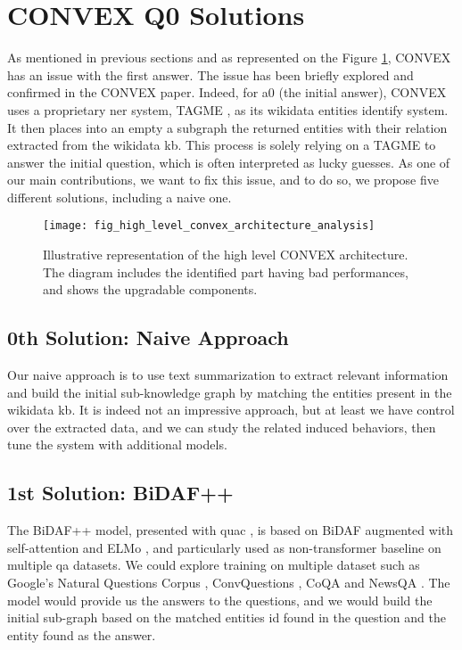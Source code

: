 \section{CONVEX Q0 Solutions}
\label{analysis:convexq0}
As mentioned in previous sections and as represented on the Figure \ref{fig:fig_high_level_convex_architecture_analysis}, CONVEX \autocite{paper:convex} has an issue with the first answer. The issue has been briefly explored and confirmed in the CONVEX paper. Indeed, for a0 (the initial answer), CONVEX uses a proprietary \gls{ner} system, TAGME \autocite{paper:CIKM-2010-FerraginaS}, as its \gls{wikidata} entities identify system. It then places into an empty a subgraph the returned entities with their relation extracted from the \gls{wikidata} \gls{kb}. This process is solely relying on a TAGME to answer the initial question, which is often interpreted as lucky guesses. As one of our main contributions, we want to fix this issue, and to do so, we propose five different solutions, including a naive one. 

\begin{figure}
    \centering
    \texttt{[image: fig\_high\_level\_convex\_architecture\_analysis]}
    \caption{Illustrative representation of the high level CONVEX architecture. The diagram includes the identified part having bad performances, and shows the upgradable components.}
    \label{fig:fig_high_level_convex_architecture_analysis}
\end{figure}

\subsection{0th Solution: Naive Approach}
\label{analysis:naive}
Our naive approach is to use text summarization to extract relevant information and build the initial sub-knowledge graph by matching the entities present in the \gls{wikidata} \gls{kb}. It is indeed not an impressive approach, but at least we have control over the extracted data, and we can study the related induced behaviors, then tune the system with additional models.

\subsection{1st Solution: BiDAF++}
\label{analysis:bidaf}
The BiDAF++ model, presented with \gls{quac} \autocite{paper:journals/corr/abs-1808-07036}, is based on BiDAF \autocite{paper:journals/corr/SeoKFH16} augmented with self-attention \autocite{paper:journals/corr/abs-1710-10723} and ELMo \autocite{paper:journals/corr/abs-1802-05365}, and particularly used as non-\gls{transformer} baseline on multiple \gls{qa} datasets. We could explore training on multiple dataset such as Google's Natural Questions Corpus \autocite{paper:google-natural-questions}, ConvQuestions \autocite{paper:convex}, CoQA \autocite{paper:journals/corr/abs-1808-07042} and NewsQA \autocite{paper:journals/corr/TrischlerWYHSBS16}. The model would provide us the answers to the questions, and we would build the initial sub-graph based on the matched entities id found in the question and the entity found as the answer.

